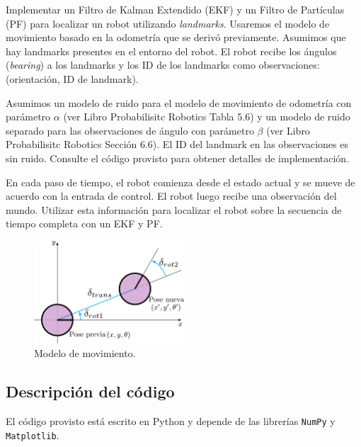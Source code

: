 \documentclass[tp]{lcc}
\begin{document}
	Implementar un Filtro de Kalman Extendido (EKF) y un Filtro de Partículas (PF) para localizar un robot utilizando \emph{landmarks}. Usaremos el modelo de movimiento basado en la odometría que se derivó previamente. Asumimos que hay landmarks presentes en el entorno del robot. El robot recibe los ángulos (\emph{bearing}) a los landmarks y los ID de los landmarks como observaciones: (orientación, ID de landmark).
	
	Asumimos un modelo de ruido para el modelo de movimiento de odometría con parámetro $\alpha$ (ver Libro Probabilisitc Robotics Tabla 5.6) y un modelo de ruido separado para las observaciones de ángulo con parámetro $\beta$ (ver Libro Probabilisitc Robotics Sección 6.6). El ID del landmark en las observaciones es sin ruido. Consulte el código provisto para obtener detalles de implementación.
	
	En cada paso de tiempo, el robot comienza desde el estado actual y se mueve de acuerdo con la entrada de control. El robot luego recibe una observación del mundo. Utilizar esta información para localizar el robot sobre la secuencia de tiempo completa con un EKF y PF.
	
	\begin{figure}[!htbp]
		\centering
		\includegraphics[width=0.5\textwidth]{./images/odometry_as_controls.pdf}
        \caption{Modelo de movimiento.}
		\label{fig:odometry-base-motion-model}
	\end{figure}

	\subsection{Descripción del código}
	
	El código provisto está escrito en Python y depende de las librerías \lstinline[style=bash]{NumPy} y \lstinline[style=bash]{Matplotlib}.
	
\end{document}
